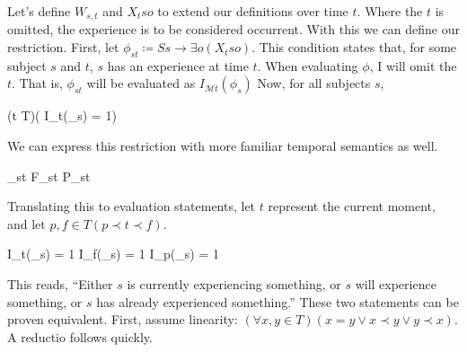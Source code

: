 \documentclass[leqno]{article}
\newcounter{lemma}
\newcommand{\temporaleval}[2]{ I_{\mathcal{M}#1}(#2) }
\begin{document}
	Let's define $W_{s,t}$ and $X_{t}so$ to extend our definitions over time $t$. Where
	the $t$ is omitted, the experience is to be considered occurrent. With this we
	can define our restriction. First, let $\phi_{st}\coloneq Ss \rightarrow \exists
	o(X_{t}so)$. This condition states that, for some subject $s$ and $t$, $s$ has
	an experience at time $t$. When evaluating $\phi$, I will omit the $t$. That is,
	$\phi_{st}$ will be evaluated as $\temporaleval{t}{\phi_s}$ Now, for all subjects
	$s$,
	\begin{lemmalist}
		[WOE.][woe] \label{woe:t1} (\exists t \in T)(\temporaleval{t}{\phi_{s}} = 1)
	\end{lemmalist}
	We can express this restriction with more familiar temporal semantics as well.
	\begin{lemmalist}
		[WOE.][woe] \label{woe:t2} \phi_{st} \lor F\phi_{st} \lor P\phi_{st}
	\end{lemmalist}
	Translating this to evaluation statements, let $t$ represent the current
	moment, and let $p, f \in T (p \prec t \prec f)$.
	\begin{lemmalist}
		[WOE.][woe] \label{woe:t3} \temporaleval{t}{\phi_s} = 1 \lor \temporaleval{f}{\phi_s}
		= 1 \lor \temporaleval{p}{\phi_s} = 1
	\end{lemmalist}
	\noindent
	This reads, \enquote{Either $s$ is currently experiencing something, or $s$ will experience something, or $s$ has already experienced something.}
	These two statements can be proven equivalent. First, assume linearity: $(\forall
	x, y \in T)(x = y \lor x \prec y \lor y \prec x)$. A reductio follows quickly.
\end{document}
